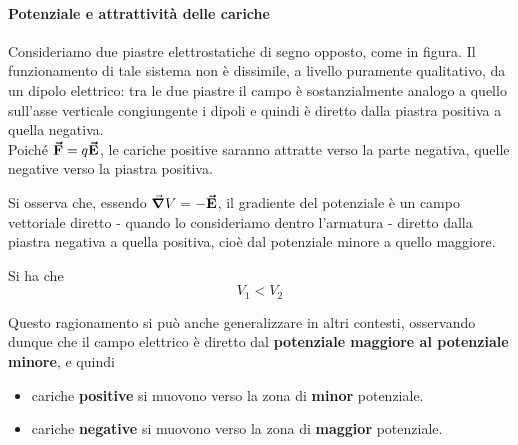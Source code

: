 \paragraph{Potenziale e attrattività delle cariche}
\begin{examplewt}
	Consideriamo due piastre elettrostatiche di segno opposto, come in figura.
	Il funzionamento di tale sistema non è dissimile, a livello puramente qualitativo, da un dipolo elettrico: tra le due piastre il campo è sostanzialmente analogo a quello sull'asse verticale congiungente i dipoli e quindi è diretto dalla piastra positiva a quella negativa.\\
	Poiché $\vb*{\va{F}}=q\vb*{\va{E}}$, le cariche positive saranno attratte verso la parte negativa, quelle negative verso la piastra positiva.
	
	Si osserva che, essendo $\grad{V}=-\vb*{\va{E}}$, il gradiente del potenziale è un campo vettoriale diretto - quando lo consideriamo dentro l'armatura - diretto dalla piastra negativa a quella positiva, cioè dal potenziale minore a quello maggiore.
	
	Si ha che
	\begin{equation*}
		V_1<V_2
	\end{equation*}
\end{examplewt}
Questo ragionamento si può anche generalizzare in altri contesti, osservando dunque che il campo elettrico è diretto dal \textbf{potenziale maggiore al potenziale minore}, e quindi
\begin{itemize}
	\item cariche \textbf{positive} si muovono verso la zona di \textbf{minor} potenziale.
	\item cariche \textbf{negative} si muovono verso la zona di \textbf{maggior} potenziale.
\end{itemize}
